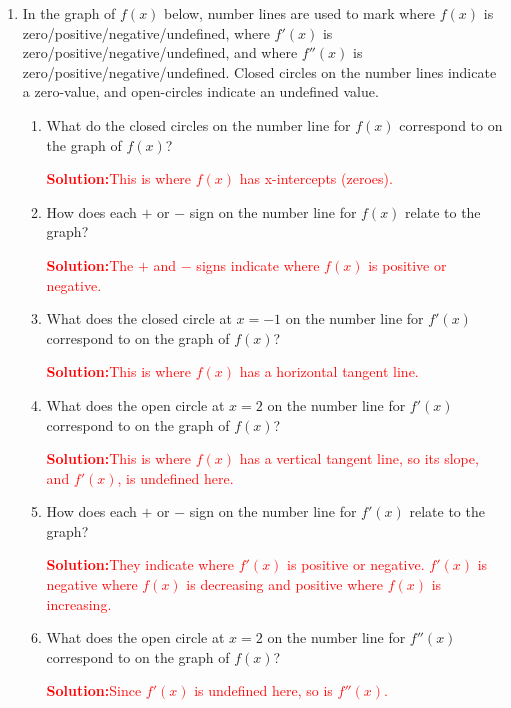 \documentclass[letterpaper,11pt]{article}
\newcommand{\sol}[2]{\begin{minipage}[c][#1]{\linewidth}{\textcolor{red}{\textbf{Solution:}}\quad \textcolor{red}{#2}}\end{minipage}}
\newcommand{\sol}[2]{\begin{minipage}[c][#1]{\linewidth}{\vfill}\end{minipage}}
\begin{document}
\chead{}

\begin{enumerate}
\item  In the graph of $f(x)$ below, number lines are used to mark where $f(x)$ is zero/positive/negative/undefined, where $f'(x)$ is zero/positive/negative/undefined,
and where $f''(x)$ is zero/positive/negative/undefined.  Closed circles on the number lines indicate a zero-value, and open-circles indicate an undefined value.
\begin{enumerate}
\item  What do the closed circles on the number line for $f(x)$ correspond to on the graph of $f(x)$?

\sol{.4 in}{This is where $f(x)$ has x-intercepts (zeroes).}

\item  How  does each $+$ or $-$ sign on the number line for $f(x)$ relate to the graph?

\sol{.4 in}{The $+$ and $-$ signs indicate where $f(x)$ is positive or negative.}

\item  What does the closed circle at $x=-1$ on the number line for $f'(x)$ correspond to on the graph of $f(x)$?

\sol{.4 in}{This is where $f(x)$ has a horizontal tangent line.}

\item  What does the open circle at $x=2$ on the number line for $f'(x)$ correspond to on the graph of $f(x)$?

\sol{.4 in}{This is where $f(x)$ has a vertical tangent line, so its slope, and $f'(x)$, is undefined here.}

\item   How does each $+$ or $-$ sign on the number line for $f'(x)$ relate to the graph?

\sol{.4 in}{They indicate where $f'(x)$ is positive or negative. $f'(x)$ is negative where $f(x)$ is decreasing and positive where $f(x)$ is increasing.}

\item What does the open circle at $x=2$ on the number line for $f''(x)$ correspond to on the graph of $f(x)$?

\sol{.4 in}{Since $f'(x)$ is undefined here, so is $f''(x)$.}


\end{enumerate}
\end{enumerate}
\end{document}

